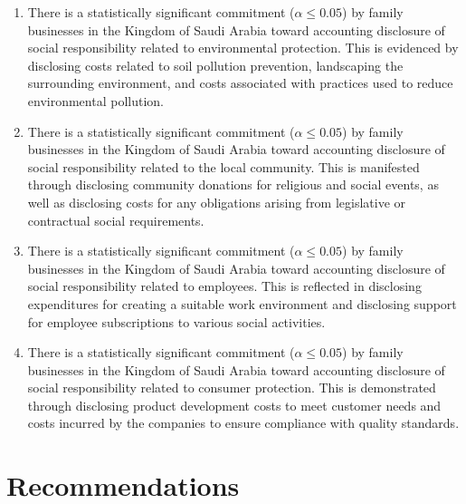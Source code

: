 \documentclass[10pt]{NSP1}
\begin{document}
	\begin{enumerate}
		\item There is a statistically significant commitment (\(\alpha \leq 0.05\)) by family businesses in the Kingdom of Saudi Arabia toward accounting disclosure of social responsibility related to environmental protection. This is evidenced by disclosing costs related to soil pollution prevention, landscaping the surrounding environment, and costs associated with practices used to reduce environmental pollution.
		\item There is a statistically significant commitment (\(\alpha \leq 0.05\)) by family businesses in the Kingdom of Saudi Arabia toward accounting disclosure of social responsibility related to the local community. This is manifested through disclosing community donations for religious and social events, as well as disclosing costs for any obligations arising from legislative or contractual social requirements.
		\item There is a statistically significant commitment (\(\alpha \leq 0.05\)) by family businesses in the Kingdom of Saudi Arabia toward accounting disclosure of social responsibility related to employees. This is reflected in disclosing expenditures for creating a suitable work environment and disclosing support for employee subscriptions to various social activities.
		\item There is a statistically significant commitment (\(\alpha \leq 0.05\)) by family businesses in the Kingdom of Saudi Arabia toward accounting disclosure of social responsibility related to consumer protection. This is demonstrated through disclosing product development costs to meet customer needs and costs incurred by the companies to ensure compliance with quality standards.
	\end{enumerate}
	
	\section{Recommendations}
	
\end{document}
